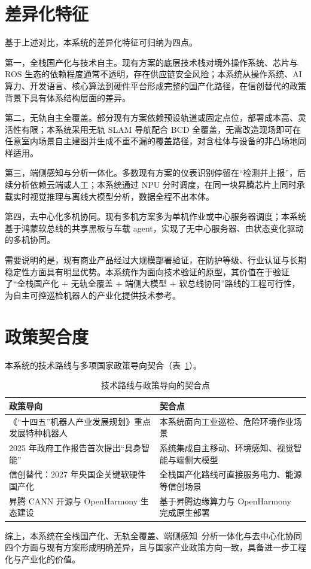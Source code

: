 \section{差异化特征}
\label{sec:differentiation}

基于上述对比，本系统的差异化特征可归纳为四点。

第一，全栈国产化与技术自主。现有方案的底层技术栈对境外操作系统、芯片与 ROS 生态的依赖程度通常不透明，存在供应链安全风险；本系统从操作系统、AI 算力、开发语言、核心算法到硬件平台形成完整的国产化路径，在信创替代的政策背景下具有体系结构层面的差异。

第二，无轨自主全覆盖。部分现有方案依赖预设轨道或固定点位，部署成本高、灵活性有限；本系统采用无轨 SLAM 导航配合 BCD 全覆盖，无需改造现场即可在任意室内场景自主建图并生成不重不漏的覆盖路径，对含柱体与设备的非凸场地同样适用。

第三，端侧感知与分析一体化。多数现有方案的仪表识别停留在“检测并上报”，后续分析依赖云端或人工；本系统通过 NPU 分时调度，在同一块昇腾芯片上同时承载实时视觉推理与离线大模型分析，数据全程不出本体。

第四，去中心化多机协同。现有多机方案多为单机作业或中心服务器调度；本系统基于鸿蒙软总线的共享黑板与车载 agent，实现了无中心服务器、由状态变化驱动的多机协同。

需要说明的是，现有商业产品经过大规模部署验证，在防护等级、行业认证与长期稳定性方面具有明显优势。本系统作为面向技术验证的原型，其价值在于验证了“全栈国产化 + 无轨全覆盖 + 端侧大模型 + 软总线协同”路线的工程可行性，为自主可控巡检机器人的产业化提供技术参考。

\section{政策契合度}
\label{sec:policy-alignment}

本系统的技术路线与多项国家政策导向契合（表~\ref{tab:policy-alignment}）。

\begin{table}[htbp]
\centering
\caption{技术路线与政策导向的契合点}
\label{tab:policy-alignment}
\small
\begin{tabularx}{\textwidth}{p{5cm}X}
\toprule
\textbf{政策导向} & \textbf{契合点} \\
\midrule
《“十四五”机器人产业发展规划》重点发展特种机器人 & 本系统面向工业巡检、危险环境作业场景 \\
2025 年政府工作报告首次提出“具身智能” & 系统集成自主移动、环境感知、视觉智能与端侧大模型 \\
信创替代：2027 年央国企关键软硬件国产化 & 全栈国产化路线可直接服务电力、能源等信创场景 \\
昇腾 CANN 开源与 OpenHarmony 生态建设 & 基于昇腾边缘算力与 OpenHarmony 完成原生部署 \\
\bottomrule
\end{tabularx}
\end{table}

综上，本系统在全栈国产化、无轨全覆盖、端侧感知--分析一体化与去中心化协同四个方面与现有方案形成明确差异，且与国家产业政策方向一致，具备进一步工程化与产业化的价值。
